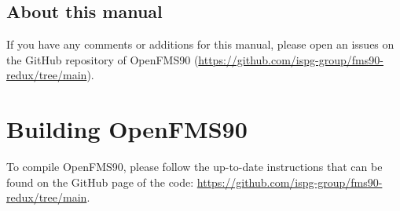 \documentclass[11pt]{article}
\begin{document}
\subsection{About this manual}

If you have any comments or additions for this manual, please open an issues on the GitHub repository of OpenFMS90 (\url{https://github.com/ispg-group/fms90-redux/tree/main}).

\newpage \section{Building OpenFMS90}
\label{build}

To compile OpenFMS90, please follow the up-to-date instructions that can be found on the GitHub page of the code: \url{https://github.com/ispg-group/fms90-redux/tree/main}.




\end{document}
